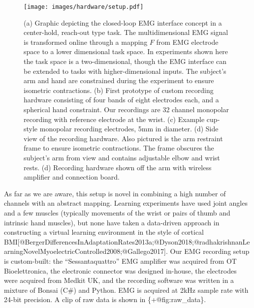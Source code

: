 \begin{figure}
\label{fig:setup}
\centering
\texttt{[image: images/hardware/setup.pdf]}
\caption{(a) Graphic depicting the closed-loop EMG interface concept in
a center-hold, reach-out type task. The multidimensional EMG signal is
transformed online through a mapping \(F\) from EMG electrode space to a
lower dimensional task space. In experiments shown here the task space
is a two-dimensional, though the EMG interface can be extended to tasks
with higher-dimensional inputs. The subject's arm and hand are
constrained during the experiment to ensure isometric contractions. (b)
First prototype of custom recording hardware consisting of four bands of
eight electrodes each, and a spherical hand constraint. Our recordings
are 32 channel monopolar recording with reference electrode at the
wrist. (c) Example cup-style monopolar recording electrodes, 5mm in
diameter. (d) Side view of the recording hardware. Also pictured is the
arm restraint frame to ensure isometric contractions. The frame obscures
the subject's arm from view and contains adjustable elbow and wrist
rests. (d) Recording hardware shown off the arm with wireless amplifier
and connection board.}\label{fig:setup}
\end{figure}

As far as we are aware, this setup is novel in combining a high number
of channels with an abstract mapping. Learning experiments have used
joint angles and a few muscles (typically movements of the wrist or
pairs of thumb and intrinsic hand muscles), but none have taken a
data-driven approach in constructing a virtual learning environment in
the style of cortical
BMI{[}@BergerDifferencesInAdaptationRates2013a;@Dyson2018;@radhakrishnanLearningNovelMyoelectricControlled2008;@Gallego2017{]}.
Our EMG recording setup is custom-built: the ``Sessantaquattro'' EMG
amplifier was acquired from OT Bioelettronica, the electronic connector
was designed in-house, the electrodes were acquired from Medkit UK, and
the recording software was written in a mixture of Bonsai (C\#) and
Python. EMG is acquired at 2kHz sample rate with 24-bit precision. A
clip of raw data is shown in \{+@fig:raw\_data\}.

